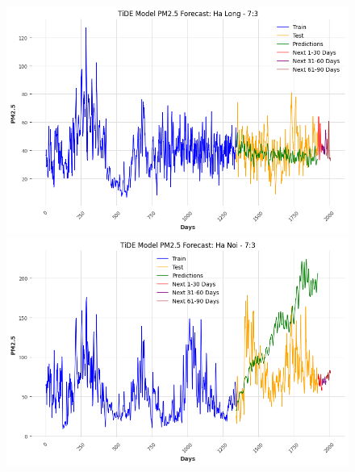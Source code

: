\begin{figure}[H]

    \centering
    \begin{minipage}{0.15\textwidth}
    \centering
    \end{minipage}
    \hfill

    \begin{minipage}{0.15\textwidth}
        \centering
        \includegraphics[width=1\textwidth]{img/final/TiDE/90D/TiDE_7_3_HL.png}
        \end{minipage}
        \hfill
        \begin{minipage}{0.15\textwidth}
        \centering
        \includegraphics[width=1\textwidth]{img/final/TiDE/90D/TiDE_7_3_HN.png}
        \end{minipage}
        \hfill
        \begin{minipage}{0.15\textwidth}

\end{minipage}
\end{figure}
